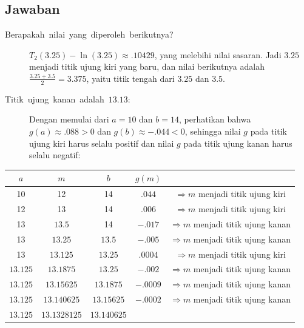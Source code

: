 \subsection*{Jawaban}
\begin{description}
\item [{Berapakah~nilai~yang~diperoleh~berikutnya?}] \label{subsec:bisectionAnswer1}
$T_{2}(3.25)-\ln(3.25)\approx.10429$, yang melebihi nilai sasaran.
Jadi $3.25$ menjadi titik ujung kiri yang baru, dan nilai berikutnya
adalah $\frac{3.25+3.5}{2}=3.375$, yaitu titik tengah dari $3.25$
dan $3.5$.
\item [{Titik~ujung~kanan~adalah~$13.13$:}] \label{subsec:bisectionAnswer2}
Dengan memulai dari $a=10$ dan $b=14$, perhatikan bahwa $g(a)\approx.088>0$
dan $g(b)\approx-.044<0$, sehingga nilai $g$ pada titik ujung kiri
harus selalu positif dan nilai $g$ pada titik ujung kanan harus selalu
negatif:
\end{description}
\begin{center}
\begin{tabular}{ccccc}
$a$ & $m$ & $b$ & $g(m)$ & \tabularnewline
\hline 
10 & 12 & 14 & $.044$ & $\Rightarrow m$ menjadi titik ujung kiri\tabularnewline
12 & 13 & 14 & $.006$ & $\Rightarrow m$ menjadi titik ujung kiri\tabularnewline
13 & $13.5$ & 14 & $-.017$ & $\Rightarrow m$ menjadi titik ujung kanan\tabularnewline
13 & $13.25$ & $13.5$ & $-.005$ & $\Rightarrow m$ menjadi titik ujung kanan\tabularnewline
13 & $13.125$ & $13.25$ & $.0004$ & $\Rightarrow m$ menjadi titik ujung kiri\tabularnewline
$13.125$ & $13.1875$ & $13.25$ & $-.002$ & $\Rightarrow m$ menjadi titik ujung kanan\tabularnewline
$13.125$ & $13.15625$ & $13.1875$ & $-.0009$ & $\Rightarrow m$ menjadi titik ujung kanan\tabularnewline
$13.125$ & $13.140625$ & $13.15625$ & $-.0002$ & $\Rightarrow m$ menjadi titik ujung kanan\tabularnewline
$13.125$ & $13.1328125$ & $13.140625$ &  & \tabularnewline
\end{tabular}
\par\end{center}
